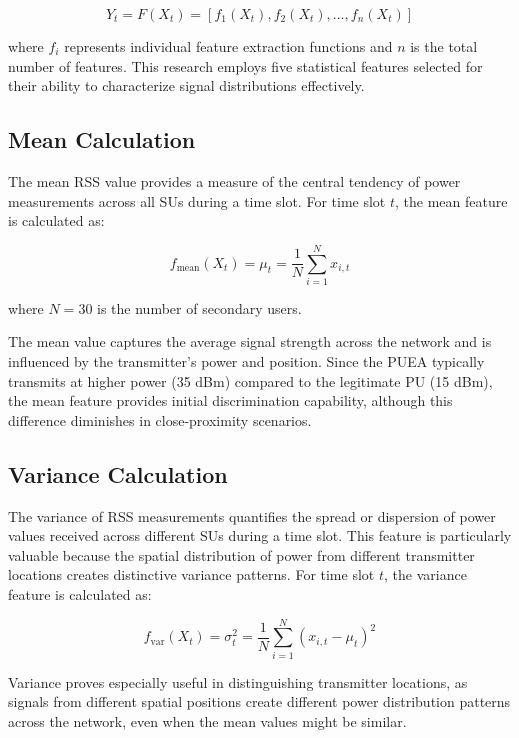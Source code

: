 \begin{equation}
    Y_t = F(X_t) = [f_1(X_t), f_2(X_t), \ldots, f_n(X_t)]
\end{equation}

where $f_i$ represents individual feature extraction functions and $n$ is the total number of features. This research employs five statistical features selected for their ability to characterize signal distributions effectively.

\subsection{Mean Calculation}

The mean RSS value provides a measure of the central tendency of power measurements across all SUs during a time slot. For time slot $t$, the mean feature is calculated as:

\begin{equation}
    f_{\text{mean}}(X_t) = \mu_t = \frac{1}{N} \sum_{i=1}^{N} x_{i,t}
\end{equation}

where $N = 30$ is the number of secondary users.

The mean value captures the average signal strength across the network and is influenced by the transmitter's power and position. Since the PUEA typically transmits at higher power (35 dBm) compared to the legitimate PU (15 dBm), the mean feature provides initial discrimination capability, although this difference diminishes in close-proximity scenarios.

\subsection{Variance Calculation}

The variance of RSS measurements quantifies the spread or dispersion of power values received across different SUs during a time slot. This feature is particularly valuable because the spatial distribution of power from different transmitter locations creates distinctive variance patterns. For time slot $t$, the variance feature is calculated as:

\begin{equation}
    f_{\text{var}}(X_t) = \sigma_t^2 = \frac{1}{N} \sum_{i=1}^{N} (x_{i,t} - \mu_t)^2
\end{equation}

Variance proves especially useful in distinguishing transmitter locations, as signals from different spatial positions create different power distribution patterns across the network, even when the mean values might be similar.

